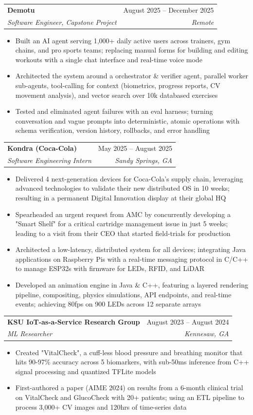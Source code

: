 \documentclass[letterpaper,11pt]{article}
\makeatletter
\newcommand{\resumeItem}[1]{
  \item\small{
    {#1 \vspace{-2pt}}
  }
}
\newcommand{\resumeSubheading}[4]{
  \vspace{-2pt}\item
    \begin{tabular*}{0.97\textwidth}[t]{l@{\extracolsep{\fill}}r}
      \textbf{#1} & #2 \\
      \textit{\small#3} & \textit{\small #4} \\
    \end{tabular*}\vspace{-7pt}
}
\newcommand{\resumeItemListStart}{\begin{itemize}}
\newcommand{\resumeItemListEnd}{\end{itemize}\vspace{-5pt}}
\makeatother
\begin{document}
        \resumeSubheading
      {Demotu}{August 2025 -- December 2025}
      {Software Engineer, Capstone Project}{Remote}
      \resumeItemListStart
        \resumeItem{Built an AI agent serving 1,000+ daily active users across trainers, gym chains, and pro sports teams; replacing manual forms for building and editing workouts with a single chat interface and real-time voice mode}
        \resumeItem{Architected the system around a orchestrator \& verifier agent, parallel worker sub-agents, tool-calling for context (biometrics, progress reports, CV movement analysis), and vector search over 10k databased exercises}
        \resumeItem{Tested and eliminated agent failures with an eval harness; turning conversation and vague prompts into deterministic, atomic operations with schema verification, version history, rollbacks, and error handling}
      \resumeItemListEnd

    \resumeSubheading
      {Kondra (Coca-Cola)}{May 2025 -- August 2025}
      {Software Engineering Intern}{Sandy Springs, GA}
      \resumeItemListStart
        \resumeItem{Delivered 4 next-generation devices for Coca-Cola's supply chain, leveraging advanced technologies to validate their new distributed OS in 10 weeks; resulting in a permanent Digital Innovation display at their global HQ}
        \resumeItem{Spearheaded an urgent request from AMC by concurrently developing a "Smart Shelf" for a critical cartridge management issue in just 5 weeks; leading to a visit from their CEO that started field-trials for production}
        \resumeItem{Architected a low-latency, distributed system for all devices; integrating Java applications on Raspberry Pis with a real-time messaging protocol in C/C++ to manage ESP32s with firmware for LEDs, RFID, and LiDAR}
        \resumeItem{Developed an animation engine in Java \& C++, featuring a layered rendering pipeline, compositing, physics simulations, API endpoints, and real-time events; achieving 80fps on 900 LEDs across 12 separate arrays}
      \resumeItemListEnd

          \resumeSubheading
      {KSU IoT-as-a-Service Research Group}{August 2023 -- August 2024}
      {ML Researcher}{Kennesaw, GA}
      \resumeItemListStart
        \resumeItem{Created "VitalCheck", a cuff-less blood pressure and breathing monitor that hits 90-97\% accuracy across 5 biomarkers, with sub-50ms inference from C++ signal processing and quantized TFLite models}
        \resumeItem{First-authored a paper (AIME 2024) on results from a 6-month clinical trial on VitalCheck and GlucoCheck with 20+ patients; using an ETL pipeline to process 3,000+ CV images and 120hrs of time-series data}
      \resumeItemListEnd
\end{document}

